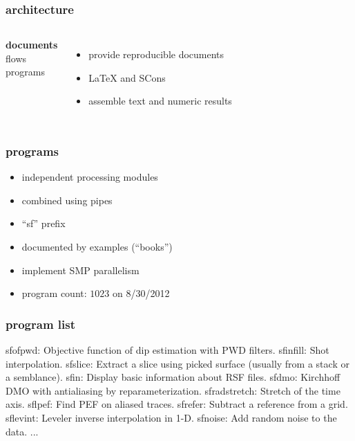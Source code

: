 \begin{frame} \frametitle{\mg architecture}

  \begin{columns}
    \textbf{documents} \\
    \vspace{0.25in}
    flows \\
    \vspace{0.25in}
    programs
    
    \begin{itemize}
    \item provide reproducible documents
    \item \LaTeX\; and SCons
    \item assemble text and numeric results
    \end{itemize}
    
  \end{columns}
  
\end{frame}
\cwpnote{}


\begin{frame} \frametitle{programs}

  \begin{itemize}
  \item independent processing modules
  \item combined using pipes
  \item ``sf'' prefix
  \item documented by examples (``books'')
  \item implement SMP parallelism
  \item program count: $1023$ on 8/30/2012
  \end{itemize}
  
\end{frame}
\cwpnote{}

\begin{frame}[fragile] \frametitle{program list}
  

  \tiny
  \begin{semiverbatim}
    sfofpwd: Objective function of dip estimation with PWD filters.
    sfinfill: Shot interpolation.
    sfslice: Extract a slice using picked surface (usually from a stack or a semblance).
    sfin: Display basic information about RSF files.
    sfdmo: Kirchhoff DMO with antialiasing by reparameterization.
    sfradstretch: Stretch of the time axis.
    sflpef: Find PEF on aliased traces.
    sfrefer: Subtract a reference from a grid.
    sflevint: Leveler inverse interpolation in 1-D.
    sfnoise: Add random noise to the data.
    ...
  \end{semiverbatim}

\end{frame}
\cwpnote{}

